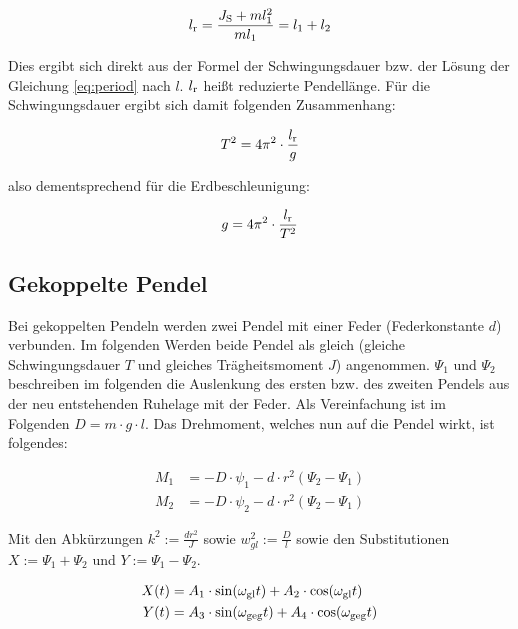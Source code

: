 \begin{equation*}
l_{\mathrm{r}} = \frac{J_{\mathrm{S}}+ml^2_1}{ml_1} = l_1 + l_2
\end{equation*}

Dies ergibt sich direkt aus der Formel der Schwingungsdauer bzw. der Lösung der Gleichung \ref{eq:period} nach $l$. $l_{\mathrm{r}}$ heißt reduzierte Pendellänge. Für die Schwingungsdauer ergibt sich damit folgenden Zusammenhang:

\begin{equation*}
T^2 = 4\pi^2 \cdot \frac{l_{\mathrm{r}}}{g}
\end{equation*}

also dementsprechend für die Erdbeschleunigung:

\begin{equation}
g = 4\pi^2 \cdot \frac{l_{\mathrm{r}}}{T^2}
\label{eq:gravity}
\end{equation}

\subsection{Gekoppelte Pendel}
Bei gekoppelten Pendeln werden zwei Pendel mit einer Feder (Federkonstante $d$) verbunden. Im folgenden Werden beide Pendel als gleich (gleiche Schwingungsdauer $T$ und gleiches Trägheitsmoment $J$) angenommen. $\Psi_1$ und $\Psi_2$ beschreiben im folgenden die Auslenkung des ersten bzw. des zweiten Pendels aus der neu entstehenden Ruhelage mit der Feder. Als Vereinfachung ist im Folgenden $D = m \cdot g \cdot l$. Das Drehmoment, welches nun auf die Pendel wirkt, ist folgendes:

\begin{align*}
M_1 &= -D \cdot \psi_1 - d \cdot r^2(\Psi_2 - \Psi_1)   \label{eq:drehmoment1} \\
M_2 &= -D \cdot \psi_2 - d \cdot r^2(\Psi_2 - \Psi_1)   \label{eq:drehmoment2}
\end{align*}

Mit den Abkürzungen $k^2 := \frac{dr^2}{J}$ sowie $w_{gl}^2 := \frac{D}{l}$ sowie den Substitutionen $X := \Psi_1 + \Psi_2$ und $Y := \Psi_1 - \Psi_2$.

\begin{align}
X(t) &= A_1 \cdot \sin (\omega_{\mathrm{gl}}t) + A_2 \cdot \cos (\omega_{\mathrm{gl}}t)		\label{eq:subst1} \\
Y(t) &= A_3 \cdot \sin (\omega_{\mathrm{geg}}t) + A_4 \cdot \cos (\omega_{\mathrm{geg}}t) 	\label{eq:subst2}
\end{align}

